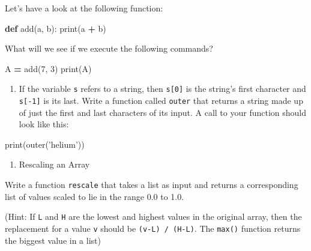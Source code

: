 \documentclass[]{book}
\newenvironment{Shaded}{\begin{snugshade}}{\end{snugshade}}
\newcommand{\BuiltInTok}[1]{#1}
\newcommand{\DecValTok}[1]{\textcolor[rgb]{0.00,0.00,0.81}{#1}}
\newcommand{\KeywordTok}[1]{\textcolor[rgb]{0.13,0.29,0.53}{\textbf{#1}}}
\newcommand{\NormalTok}[1]{#1}
\newcommand{\OperatorTok}[1]{\textcolor[rgb]{0.81,0.36,0.00}{\textbf{#1}}}
\newcommand{\StringTok}[1]{\textcolor[rgb]{0.31,0.60,0.02}{#1}}
\providecommand{\tightlist}{%
  \setlength{\itemsep}{0pt}\setlength{\parskip}{0pt}}
\theoremstyle{definition}
\theoremstyle{definition}
\theoremstyle{definition}
\theoremstyle{remark}
\begin{document}
Let's have a look at the following function:

\begin{Shaded}
\begin{Highlighting}[]
\KeywordTok{def}\NormalTok{ add(a, b):}
   \BuiltInTok{print}\NormalTok{(a }\OperatorTok{+}\NormalTok{ b)}
\end{Highlighting}
\end{Shaded}

What will we see if we execute the following commands?

\begin{Shaded}
\begin{Highlighting}[]
\NormalTok{A }\OperatorTok{=}\NormalTok{ add(}\DecValTok{7}\NormalTok{, }\DecValTok{3}\NormalTok{)}
\BuiltInTok{print}\NormalTok{(A)}
\end{Highlighting}
\end{Shaded}

\begin{enumerate}
\def\labelenumi{\arabic{enumi}.}
\setcounter{enumi}{2}
\tightlist
\item
  If the variable \texttt{s} refers to a string, then \texttt{s{[}0{]}}
  is the string's first character and \texttt{s{[}-1{]}} is its last.
  Write a function called \texttt{outer} that returns a string made up
  of just the first and last characters of its input. A call to your
  function should look like this:
\end{enumerate}

\begin{Shaded}
\begin{Highlighting}[]
\BuiltInTok{print}\NormalTok{(outer(}\StringTok{'helium'}\NormalTok{))}
\end{Highlighting}
\end{Shaded}

\begin{enumerate}
\def\labelenumi{\arabic{enumi}.}
\setcounter{enumi}{3}
\tightlist
\item
  Rescaling an Array
\end{enumerate}

Write a function \texttt{rescale} that takes a list as input and returns
a corresponding list of values scaled to lie in the range 0.0 to 1.0.

(Hint: If \texttt{L} and \texttt{H} are the lowest and highest values in
the original array, then the replacement for a value \texttt{v} should
be \texttt{(v-L)\ /\ (H-L)}. The \texttt{max()} function returns the
biggest value in a list)
\end{document}
